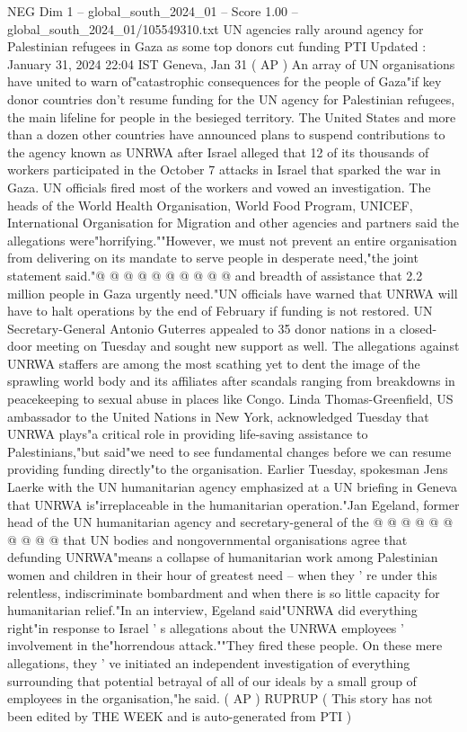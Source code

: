 \begin{textsample}{NEG Dim 1 – global\_south\_2024\_01 – Score 1.00 – global\_south\_2024\_01/105549310.txt}  \label{ex:f1_neg_349}
UN agencies rally around agency for Palestinian refugees in Gaza as some top donors cut funding PTI Updated : January 31, 2024 22:04 IST Geneva, Jan 31 ( AP ) An array of UN organisations have united to warn of"catastrophic consequences for the people of Gaza"if key donor countries don't resume funding for the UN agency for Palestinian refugees, the main lifeline for people in the besieged territory.
The United States and more than a dozen other countries have announced plans to suspend contributions to the agency known as UNRWA after Israel alleged that 12 of its thousands of workers participated in the October 7 attacks in Israel that sparked the war in Gaza.
UN officials fired most of the workers and vowed an investigation.
The heads of the World Health Organisation, World Food Program, UNICEF, International Organisation for Migration and other agencies and partners said the allegations were"horrifying.""However, we must not prevent an entire organisation from delivering on its mandate to serve people in desperate need,"the joint statement said."@ @ @ @ @ @ @ @ @ @ and breadth of assistance that 2.2 million people in Gaza urgently need."UN officials have warned that UNRWA will have to halt operations by the end of February if funding is not restored.
UN Secretary-General Antonio Guterres appealed to 35 donor nations in a closed-door meeting on Tuesday and sought new support as well.
The allegations against UNRWA staffers are among the most scathing yet to dent the image of the sprawling world body and its affiliates after scandals ranging from breakdowns in peacekeeping to sexual abuse in places like Congo.
Linda Thomas-Greenfield, US ambassador to the United Nations in New York, acknowledged Tuesday that UNRWA plays"a critical role in providing life-saving assistance to Palestinians,"but said"we need to see fundamental changes before we can resume providing funding directly"to the organisation.
Earlier Tuesday, spokesman Jens Laerke with the UN humanitarian agency emphasized at a UN briefing in Geneva that UNRWA is"irreplaceable in the humanitarian operation."Jan Egeland, former head of the UN humanitarian agency and secretary-general of the @ @ @ @ @ @ @ @ @ @ that UN bodies and nongovernmental organisations agree that defunding UNRWA"means a collapse of humanitarian work among Palestinian women and children in their hour of greatest need -- when they ' re under this relentless, indiscriminate bombardment and when there is so little capacity for humanitarian relief."In an interview, Egeland said"UNRWA did everything right"in response to Israel ' s allegations about the UNRWA employees ' involvement in the"horrendous attack.""They fired these people.
On these mere allegations, they ' ve initiated an independent investigation of everything surrounding that potential betrayal of all of our ideals by a small group of employees in the organisation,"he said. ( AP ) RUPRUP ( This story has not been edited by THE WEEK and is auto-generated from PTI )

\end{textsample}
